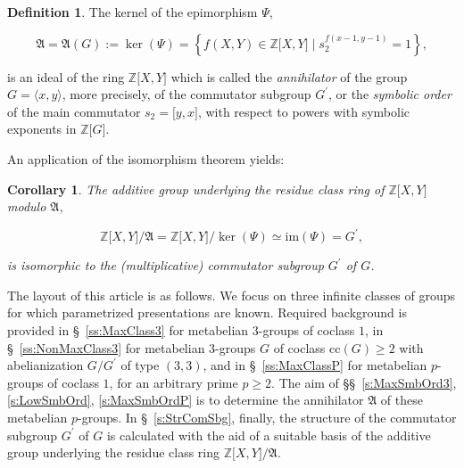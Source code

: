 \documentclass{amsart}
\newtheorem{corollary}{Corollary}[section]
\theoremstyle{definition}
\newtheorem{definition}{Definition}[section]
\numberwithin{equation}{section}
\begin{document}
\begin{definition}
\label{dfn:Annihilator}
The kernel of the epimorphism \(\Psi\),

\begin{equation}
\label{eqn:Annihilator}
\mathfrak{A}=\mathfrak{A}(G):=\ker(\Psi)=\left\lbrace f(X,Y)\in\mathbb{Z}\lbrack X,Y\rbrack\mid s_2^{f(x-1,y-1)}=1\right\rbrace,
\end{equation}

\noindent
is an ideal of the ring \(\mathbb{Z}\lbrack X,Y\rbrack\)
which is called the \textit{annihilator} of the group \(G=\langle x,y\rangle\), more precisely, of the commutator subgroup \(G^\prime\),
or the \textit{symbolic order} of the main commutator \(s_2=\lbrack y,x\rbrack\),
with respect to powers with symbolic exponents in \(\mathbb{Z}\lbrack G\rbrack\).
\end{definition}


An application of the isomorphism theorem yields:

\begin{corollary}
\label{cor:CommutatorSubgroup}
The additive group underlying the residue class ring of \(\mathbb{Z}\lbrack X,Y\rbrack\) modulo \(\mathfrak{A}\),

\begin{equation}
\label{eqn:CommutatorSubgroup}
\mathbb{Z}\lbrack X,Y\rbrack/\mathfrak{A}=\mathbb{Z}\lbrack X,Y\rbrack/\ker(\Psi)\simeq\mathrm{im}(\Psi)=G^\prime,
\end{equation}

\noindent
is isomorphic to the (multiplicative) commutator subgroup \(G^\prime\) of \(G\).
\end{corollary}


The layout of this article is as follows.
We focus on three infinite classes of groups
for which parametrized presentations are known.
Required background is provided in \S\ 
\ref{ss:MaxClass3}
for metabelian \(3\)-groups of coclass \(1\), in \S\
\ref{ss:NonMaxClass3}
for metabelian \(3\)-groups \(G\) of coclass \(\mathrm{cc}(G)\ge 2\) with abelianization \(G/G^\prime\) of type \((3,3)\), and in \S\
\ref{ss:MaxClassP}
for metabelian \(p\)-groups of coclass \(1\), for an arbitrary prime \(p\ge 2\).
The aim of \S\S\
\ref{s:MaxSmbOrd3},
\ref{s:LowSmbOrd},
\ref{s:MaxSmbOrdP}
is to determine the annihilator \(\mathfrak{A}\) of these metabelian \(p\)-groups.
In \S\
\ref{s:StrComSbg},
finally, the structure of the commutator subgroup \(G^\prime\) of \(G\) is calculated
with the aid of a suitable basis of the additive group underlying the residue class ring
\(\mathbb{Z}\lbrack X,Y\rbrack/\mathfrak{A}\).
\end{document}

